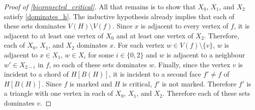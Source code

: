 \documentclass[a4paper,UKenglish,cleveref, autoref, thm-restate]{lipics-v2021}
\begin{document}
\begin{proof}[Proof of \cref{biconnected_critical}]
  All that remains is to show that $X_0$, $X_1$, and $X_2$ satisfy \cref{dominates_h}.  The inductive hypothesis already implies that each of these sets dominates $V(H)\setminus V(f)$.  Since $x$ is adjacent to every vertex of $f$, it is adjacent to at least one vertex of $X_0$ and at least one vertex of $X_2$.  Therefore, each of $X_0$, $X_1$, and $X_2$ dominates $x$.  For each vertex $w\in V(f)\setminus\{v\}$, $w$ is adjacent to $x\in X_1$, $w\in X_{i}$ for some $i\in\{0,2\}$ and $w$ is adjacent to a neighbour $w'\in X_{2-i}$ in $f$, so each of these sets dominates $w$.  Finally, since the vertex $v$ is incident to a chord of $H[B(H)]$, it is incident to a second face $f'\neq f$ of $H[B(H)]$.  Since $f$ is marked and $H$ is critical, $f'$ is not marked.  Therefore $f'$ is a triangle with one vertex in each of $X_0$, $X_1$, and $X_2$. Therefore each of these sets dominates $v$.
\end{proof}
\end{document}
